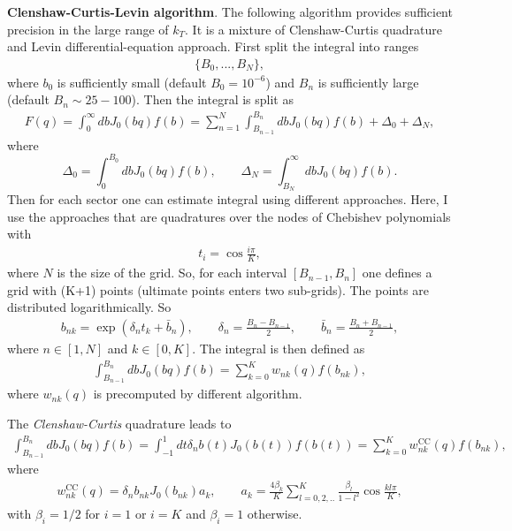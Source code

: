 \documentclass[prd,nofootinbib,eqsecnum,final]{revtex4}
\renewcommand{\(}{\left(}
\renewcommand{\)}{\right)}
\renewcommand{\[}{\left[}
\renewcommand{\]}{\right]}
\begin{document}
\textbf{Clenshaw-Curtis-Levin algorithm}. The following algorithm provides sufficient precision in the large range of $k_T$. It is a mixture of Clenshaw-Curtis quadrature and Levin differential-equation approach. First split the integral into ranges
\begin{eqnarray}
\{B_0,...,B_N\},
\end{eqnarray}
where $b_0$ is sufficiently small (default $B_0=10^{-6}$) and $B_n$ is sufficiently large (default $B_n\sim 25-100$). Then the integral is split as
\begin{eqnarray}
F(q)=\int_0^\infty db J_0(bq)f(b)= \sum_{n=1}^{N}\int_{B_{n-1}}^{B_{n}}db J_0(bq)f(b)+\Delta_0+\Delta_N,
\end{eqnarray}
where
$$\Delta_0=\int_0^{B_0}db J_0(bq)f(b),\qquad \Delta_N=\int_{B_N}^\infty db J_0(bq)f(b).$$
Then for each sector one can estimate integral using different approaches. Here, I use the approaches that are quadratures over the nodes of Chebishev polynomials with
\begin{eqnarray}
t_i=\cos \frac{i\pi}{K},
\end{eqnarray}
where $N$ is the size of the grid. So, for each interval $[B_{n-1},B_{n}]$ one defines a grid with (K+1) points (ultimate points enters two sub-grids). The points are distributed logarithmically. So
\begin{eqnarray}
b_{nk}=\exp\(\delta_n t_k+\bar b_n\),\qquad \delta_n=\frac{B_{n}-B_{n-1}}{2},\qquad \bar b_n=\frac{B_{n}+B_{n-1}}{2},
\end{eqnarray}
where $n\in [1,N]$ and $k\in [0,K]$. The integral is then defined as
\begin{eqnarray}
\int_{B_{n-1}}^{B_n}db J_0(bq)f(b)=\sum_{k=0}^K w_{nk}(q)f(b_{nk}),
\end{eqnarray}
where $w_{nk}(q)$ is precomputed by different algorithm.

The \textit{Clenshaw-Curtis} quadrature leads to
\begin{eqnarray}
\int_{B_{n-1}}^{B_n}db J_0(bq)f(b)=\int_{-1}^1 dt \delta_n b(t) J_0(b(t))f(b(t))=\sum_{k=0}^K w^{\text{CC}}_{nk}(q)f(b_{nk}),
\end{eqnarray}
where
\begin{eqnarray}
w^{\text{CC}}_{nk}(q)=\delta_n b_{nk} J_0(b_{nk})a_k,\qquad a_k=\frac{4\beta_k}{K}\sum_{l=0,2,..}^{K}\frac{\beta_l}{1-l^2}\cos\frac{kl\pi}{K},
\end{eqnarray}
with $\beta_i=1/2$ for $i=1$ or $i=K$ and $\beta_i=1$ otherwise.
\end{document}
